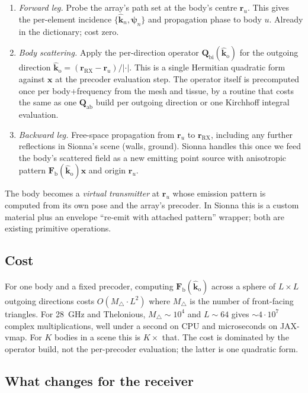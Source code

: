 \documentclass[11pt,a4paper]{article}
\theoremstyle{definition}
\newcommand{\khat}{\hat{\bm{k}}}
\newcommand{\rr}{\mathbf{r}}
\newcommand{\Qabs}{\mathbf{Q}_{\mathrm{ab}}}
\newcommand{\kout}{\hat{\bm{k}}_{\mathrm{o}}}
\newcommand{\Frib}{\mathbf{F}_{\mathrm{b}}}
\newcommand{\Qbist}{\mathbf{Q}_{\mathrm{bi}}}
\begin{document}
\begin{enumerate}[leftmargin=1.6em,itemsep=2pt]
\item \emph{Forward leg.}  Probe the array's path set at the body's
centre $\rr_u$.  This gives the per-element incidence
$\{\khat_n,\bm\psi_n\}$ and propagation phase to body $u$.  Already
in the dictionary; cost zero.
\item \emph{Body scattering.}  Apply the per-direction operator
$\Qbist(\kout)$ for the outgoing direction
$\kout=(\rr_{\mathrm{RX}}-\rr_u)/|\cdot|$.  This is a single Hermitian
quadratic form against $\mathbf{x}$ at the precoder evaluation step.
The operator itself is precomputed once per body+frequency from the
mesh and tissue, by a routine that costs the same as one $\Qabs$
build per outgoing direction or one Kirchhoff integral evaluation.
\item \emph{Backward leg.}  Free-space propagation from $\rr_u$ to
$\rr_{\mathrm{RX}}$, including any further reflections in Sionna's
scene (walls, ground).  Sionna handles this once we feed the body's
scattered field as a new emitting point source with anisotropic
pattern $\Frib(\kout)\mathbf{x}$ and origin $\rr_u$.
\end{enumerate}

The body becomes a \emph{virtual transmitter} at $\rr_u$ whose
emission pattern is computed from its own pose and the array's
precoder.  In Sionna this is a custom material plus an envelope
``re-emit with attached pattern'' wrapper; both are existing primitive
operations.

\subsection{Cost}

For one body and a fixed precoder, computing $\Frib(\kout)$ across a
sphere of $L\times L$ outgoing directions costs
$O(M_\triangle\cdot L^2)$ where $M_\triangle$ is the number of
front-facing triangles.  For \SI{28}{GHz} and Thelonious,
$M_\triangle\sim 10^4$ and $L\sim 64$ gives $\sim 4\cdot 10^7$
complex multiplications, well under a second on CPU and microseconds
on JAX-vmap.  For $K$ bodies in a scene this is $K\times$ that.  The
cost is dominated by the operator build, not the per-precoder
evaluation; the latter is one quadratic form.

\subsection{What changes for the receiver}
\end{document}
